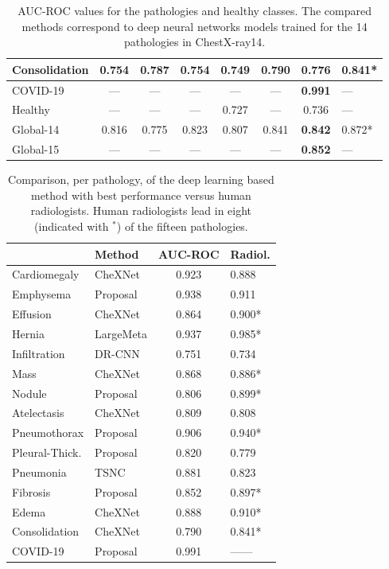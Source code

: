 \begin{table}[tb]
\begin{tabular}{|l||c|c|c|c|c|c|l|}
        Consolidation	&	0.754	&	0.787	&	0.754	&	0.749	&\bf{0.790}	&	0.776	&	0.841*	\\
        \hline
        COVID-19	    &	---	    &	---	    &	---	    &	---	    &	---	    &\bf{0.991}	&	---	    \\
        Healthy	        &	---	    &	---	    &	---	    &	0.727	&	---	    &	0.736	&	---	    \\
        \hline\hline
        Global-14	    &	0.816	&	0.775	&	0.823	&	0.807	&	0.841	&\bf{0.842}	&	0.872*	\\
        Global-15	    &	---	    &	---	    &	---	    &	---	    &	---	    &\bf{0.852}	&	---	    \\
        \hline
    \end{tabular}
    \caption{AUC-ROC values for the pathologies and healthy classes. The compared methods correspond
             to deep neural networks models trained for the 14 pathologies in ChestX-ray14.}
    \label{table_roc_auc}
\end{table}


\begin{table}[tb]
    \centering
    \begin{tabular}{|l||l|c|l|}
        \hline
                        &	Method	&	AUC-ROC	& Radiol.	\\
        \hline\hline
        Cardiomegaly	&	CheXNet	    & 0.923 &   0.888	\\
        Emphysema	    &	Proposal    & 0.938	&   0.911	\\
        Effusion	    &	CheXNet	    & 0.864 &   0.900*	\\
        Hernia	        &	LargeMeta   & 0.937	&   0.985*	\\
        Infiltration	&	DR-CNN	    & 0.751 &	0.734	\\
        Mass	        &	CheXNet	    & 0.868	&	0.886*	\\
        Nodule	        &	Proposal    & 0.806	&	0.899*	\\
        Atelectasis	    &	CheXNet	    & 0.809 &	0.808	\\
        Pneumothorax	&	Proposal    & 0.906 &	0.940*	\\
        Pleural-Thick.	&	Proposal    & 0.820	&	0.779	\\
        Pneumonia	    &	TSNC	    & 0.881 &	0.823	\\
        Fibrosis	    &	Proposal    & 0.852 &	0.897*	\\
        Edema	        &	CheXNet	    & 0.888 &	0.910*	\\
        Consolidation	&	CheXNet	    & 0.790 &	0.841*	\\
        COVID-19	    &	Proposal    & 0.991 &	------	\\
        \hline
    \end{tabular}
    \caption{Comparison, per pathology, of the deep learning based method with best performance
             versus human radiologists. Human radiologists lead in eight (indicated with $^\ast$) of
            the fifteen pathologies.}
    \label{table_dl_human}
\end{table}


